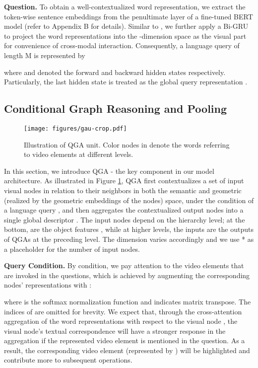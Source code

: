 \documentclass[letterpaper]{article} \usepackage{aaai21}  \usepackage{times}  \usepackage{helvet} \usepackage{courier}  \usepackage[hyphens]{url}  \usepackage{graphicx} \urlstyle{rm} \def\UrlFont{\rm}  \usepackage{natbib}  \usepackage{caption} \usepackage{color, colortbl}
\begin{document}
\textbf{Question.}
To obtain a well-contextualized word representation, we extract the token-wise sentence embeddings from the penultimate layer of a fine-tuned BERT model \cite{devlin2018bert} (refer to Appendix B for details). Similar to \cite{xiao2021next}, we further apply a Bi-GRU \cite{cho2014learning} to project the word representations into the -dimension space as the visual part for convenience of cross-modal interaction. Consequently, a language query of length M is represented by 

where  and  denoted the forward and backward hidden states respectively. Particularly, the last hidden state  is treated as the global query representation .

\subsection{Conditional Graph Reasoning and Pooling}
\begin{figure}[t]
\centering
\texttt{[image: figures/gau-crop.pdf]}
\caption{Illustration of QGA unit. Color nodes in  denote the words referring to video elements at different levels.}
\label{fig:qga}
\vspace{-1.0em}
\end{figure}
In this section, we introduce QGA - the key component in our model architecture. As illustrated in Figure \ref{fig:qga}, QGA first contextualizes a set of input visual nodes  in relation to their neighbors in both the semantic and geometric (realized by the geometric embeddings of the nodes) space, under the condition of a language query , and then aggregates the contextualized output nodes  into a single global descriptor . The input nodes  depend on the hierarchy level; at the bottom,  are the object features , while at higher levels, the inputs are the outputs of QGAs at the preceding level. The dimension varies accordingly and we use * as a placeholder for the number of input nodes.

\textbf{Query Condition.} By condition, we pay attention to the video elements that are invoked in the questions, which is achieved by augmenting the corresponding nodes' representations with :


where  is the softmax normalization function and  indicates matrix transpose. The indices of  are omitted for brevity. We expect that, through the cross-attention aggregation of the word representations with respect to the visual node , the visual node's textual correspondence will have a stronger response in the aggregation if the represented video element is mentioned in the question. As a result, the corresponding video element (represented by ) will be highlighted and contribute more to subsequent operations.
\end{document}
